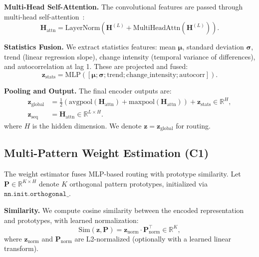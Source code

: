 \textbf{Multi-Head Self-Attention.} The convolutional features are passed through multi-head self-attention~\cite{vaswani2017attention}:
\begin{equation}
\mathbf{H}_{\text{attn}} = \text{LayerNorm}(\mathbf{H}^{(L)} + \text{MultiHeadAttn}(\mathbf{H}^{(L)})).
\end{equation}

\textbf{Statistics Fusion.} We extract statistics features: mean $\boldsymbol{\mu}$, standard deviation $\boldsymbol{\sigma}$, trend (linear regression slope), change intensity (temporal variance of differences), and autocorrelation at lag 1. These are projected and fused:
\begin{equation}
\mathbf{z}_{\text{stats}} = \text{MLP}([\boldsymbol{\mu}; \boldsymbol{\sigma}; \text{trend}; \text{change\_intensity}; \text{autocorr}]).
\end{equation}

\textbf{Pooling and Output.} The final encoder outputs are:
\begin{align}
\mathbf{z}_{\text{global}} &= \frac{1}{2}\left( \text{avgpool}(\mathbf{H}_{\text{attn}}) + \text{maxpool}(\mathbf{H}_{\text{attn}}) \right) + \mathbf{z}_{\text{stats}} \in \mathbb{R}^H, \\
\mathbf{z}_{\text{seq}} &= \mathbf{H}_{\text{attn}} \in \mathbb{R}^{L \times H}.
\end{align}
where $H$ is the hidden dimension. We denote $\mathbf{z} = \mathbf{z}_{\text{global}}$ for routing.

\subsection{Multi-Pattern Weight Estimation (C1)}
\label{sec:weight}

The weight estimator fuses MLP-based routing with prototype similarity. Let $\mathbf{P} \in \mathbb{R}^{K \times H}$ denote $K$ orthogonal pattern prototypes, initialized via $\texttt{nn.init.orthogonal\_}$.

\textbf{Similarity.} We compute cosine similarity between the encoded representation and prototypes, with learned normalization:
\begin{equation}
\text{Sim}(\mathbf{z}, \mathbf{P}) = \mathbf{z}_{\text{norm}} \cdot \mathbf{P}_{\text{norm}}^\top \in \mathbb{R}^K,
\end{equation}
where $\mathbf{z}_{\text{norm}}$ and $\mathbf{P}_{\text{norm}}$ are L2-normalized (optionally with a learned linear transform).

